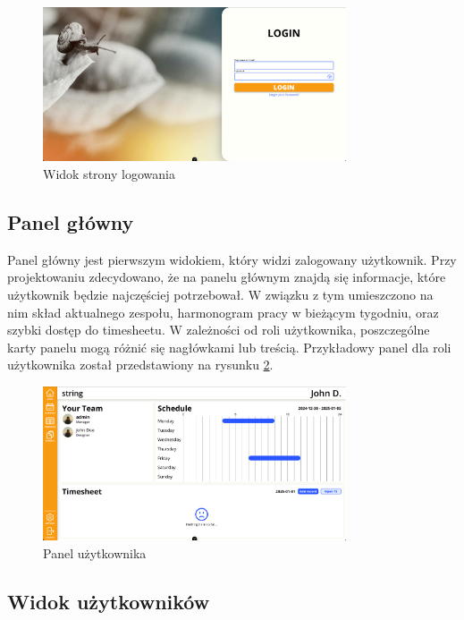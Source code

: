 \begin{figure}[H]
    \centering
    \includegraphics[width=0.8\textwidth, frame]{graf/front/loginPage.png}
    \caption{Widok strony logowania}
    \label{fig:loginPage}
\end{figure}

\subsection{Panel główny}

Panel główny jest pierwszym widokiem, który widzi zalogowany użytkownik. Przy projektowaniu zdecydowano, że na panelu głównym znajdą się informacje, które użytkownik będzie najczęściej potrzebował. W związku z tym umieszczono na nim skład aktualnego zespołu, harmonogram pracy w bieżącym tygodniu, oraz szybki dostęp do timesheetu. W zależności od roli użytkownika, poszczególne karty panelu mogą różnić się nagłówkami lub treścią. Przykładowy panel dla roli użytkownika został przedstawiony na rysunku \ref{fig:userDashboard}.

\begin{figure}[H]
    \centering
    \includegraphics[width=0.8\textwidth, frame]{graf/userDashboard.png}
    \caption{Panel użytkownika}
    \label{fig:userDashboard}
\end{figure}

\subsection{Widok użytkowników}

